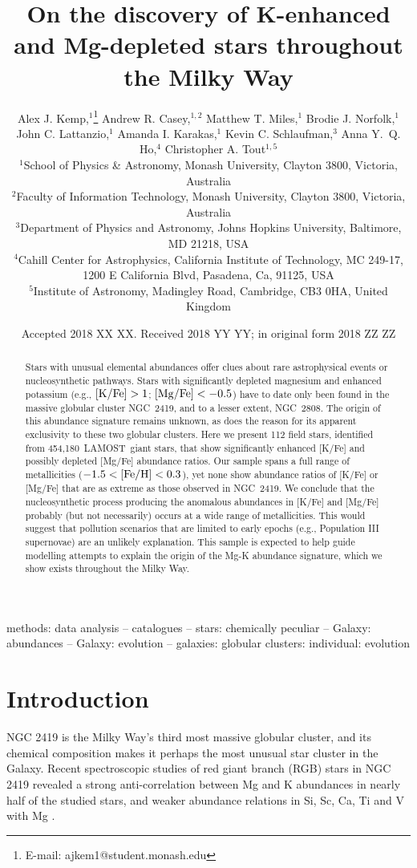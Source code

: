 \documentclass[a4paper,fleqn,usenatbib]{mnras}
\title[Mg-K stars in LAMOST]{On the discovery of K-enhanced and Mg-depleted stars throughout the Milky Way}
\author[Kemp et al.]{Alex J. Kemp,$^{1}$\thanks{E-mail: ajkem1@student.monash.edu}
Andrew R. Casey,$^{1,2}$
Matthew T. Miles,$^{1}$
Brodie J. Norfolk,$^{1}$\newauthor
John C. Lattanzio,$^{1}$
Amanda I. Karakas,$^{1}$
Kevin C. Schlaufman,$^{3}$
Anna Y.~Q. Ho,$^{4}$\newauthor
Christopher A. Tout$^{1,5}$
\\
$^{1}$School of Physics \& Astronomy, Monash University, Clayton 3800, Victoria, Australia\\
$^{2}$Faculty of Information Technology, Monash University, Clayton 3800, Victoria, Australia\\
$^{3}$Department of Physics and Astronomy, Johns Hopkins University, Baltimore, MD 21218, USA\\
$^{4}$Cahill Center for Astrophysics, California Institute of Technology, MC 249-17, 1200 E California Blvd, Pasadena, Ca, 91125, USA\\
$^{5}$Institute of Astronomy, Madingley Road, Cambridge, CB3 0HA, United Kingdom\\
}
\date{Accepted 2018 XX XX. Received 2018 YY YY; in original form 2018 ZZ ZZ}
\newcommand{\LamostGiants}{454,180}
\newcommand{\project}[1]{#1}
\newcommand{\lamost}{\project{LAMOST}}
\begin{document}
\label{firstpage}
\pagerange{\pageref{firstpage}--\pageref{lastpage}}
\maketitle


\begin{abstract}
Stars with unusual elemental abundances offer clues about rare astrophysical events or nucleosynthetic pathways. Stars with significantly depleted magnesium and enhanced potassium (e.g., $[{\rm K}/{\rm Fe}] > 1$; $[{\rm Mg}/{\rm Fe}] < -0.5$) have to date only been found in the massive globular cluster NGC~2419, and to a lesser extent, NGC~2808. The origin of this abundance signature remains unknown, as does the reason for its apparent exclusivity to these two globular clusters. Here we present 112 field stars, identified from \LamostGiants\ \lamost\ giant stars, that show significantly enhanced [K/Fe] and possibly depleted [Mg/Fe] abundance ratios.
Our sample spans a full range of metallicities ($-1.5 < [{\rm Fe}/{\rm H}] < 0.3$), yet none show abundance ratios of [K/Fe] or [Mg/Fe] that are as extreme as those observed in NGC~2419. 
We conclude that the nucleosynthetic process producing the anomalous abundances in [K/Fe] and [Mg/Fe] probably (but not necessarily) occurs at a wide range of metallicities. This would suggest that pollution scenarios that are limited to early epochs (e.g., Population III supernovae) are an unlikely explanation. This sample is expected to help guide modelling attempts to explain the origin of the Mg-K abundance signature, which we show exists throughout the Milky Way.
\end{abstract}

\begin{keywords}
methods: data analysis -- catalogues -- stars: chemically peculiar -- Galaxy: abundances -- Galaxy: evolution -- galaxies: globular clusters: individual: evolution
\end{keywords}



\section{Introduction}
\label{sec:intro}
NGC 2419 is the Milky Way's third most massive globular cluster, and its chemical composition makes it perhaps the most unusual star cluster in the Galaxy. Recent spectroscopic studies of red giant branch (RGB) stars in NGC 2419 revealed a strong anti-correlation between Mg and K abundances in nearly half of the studied stars, and weaker abundance relations in Si, Sc, Ca, Ti and V with Mg \citep{mucciarelli2012,cohenkirby2012}.
\end{document}
